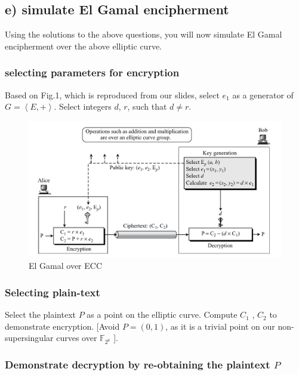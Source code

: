 \documentclass[a4paper,11pt]{exam}
\begin{document}
\subsection{e) simulate El Gamal encipherment}
\label{sec:org7ea26e5}
Using the solutions to the above questions, you will now simulate El Gamal encipherment over the above elliptic curve.

\subsubsection{selecting parameters for encryption}
\label{sec:orga5602a2}
Based on Fig.1, which is reproduced from our slides, select \(e_1\) as a generator of \(G = \left<E, +\right>\). Select integers \(d\), \(r\), such that \(d \ne r\).

\begin{center}
\begin{figure}[h]
    \centering
    \includegraphics[width=16cm]{./images/fig1_hw3.png}
    \caption{El Gamal over ECC}
    \label{fig:fig1_hw3}
  \end{figure}
\end{center}

\subsubsection{Selecting plain-text}
\label{sec:orgd4df783}
Select the plaintext \(P\) as a point on the elliptic curve. Compute \(C_1\) , \(C_2\) to demonstrate encryption. [Avoid \(P = (0, 1)\), as it is a trivial point on our non-supersingular curves over \(\mathbb{F}_{2^k}\) ].

\subsubsection{Demonstrate decryption by re-obtaining the plaintext \(P\)}
\label{sec:org352ce4e}
\end{document}
